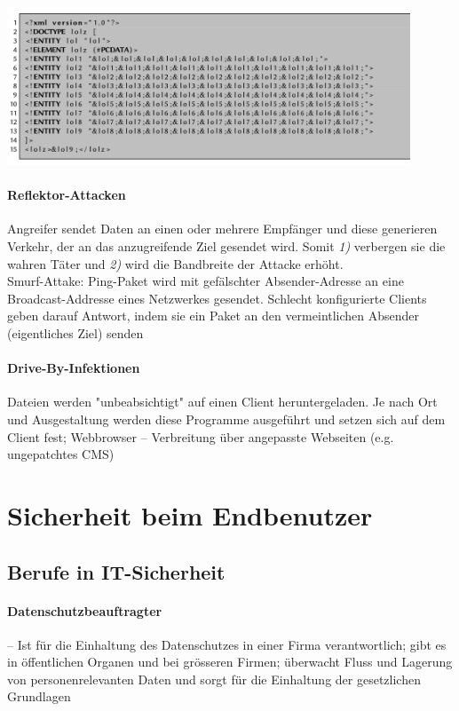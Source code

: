 \documentclass[a4paper,12pt]{article}
\begin{document}
\begin{center}
\includegraphics[width=12cm]{img/13_bi_lau.png}
\end{center}



\paragraph{Reflektor-Attacken}
Angreifer sendet Daten an einen oder mehrere Empfänger und diese generieren Verkehr, der an das anzugreifende Ziel gesendet wird. Somit \emph{1)} verbergen sie die wahren Täter und \emph{2)} wird die Bandbreite der Attacke erhöht.\\

Smurf-Attake: Ping-Paket wird mit gefälschter Absender-Adresse an eine Broadcast-Addresse eines Netzwerkes gesendet. Schlecht konfigurierte Clients geben darauf Antwort, indem sie ein Paket an den vermeintlichen Absender (eigentliches Ziel) senden


\paragraph{Drive-By-Infektionen}
Dateien werden "unbeabsichtigt" auf einen Client heruntergeladen. Je nach Ort und Ausgestaltung werden diese Programme ausgeführt und setzen sich auf dem Client fest; Webbrowser -- Verbreitung über angepasste Webseiten (e.g. ungepatchtes CMS)


\newpage
\section{Sicherheit beim Endbenutzer}

\subsection{Berufe in IT-Sicherheit}

\paragraph{Datenschutzbeauftragter} -- Ist für die Einhaltung des Datenschutzes in einer Firma verantwortlich; gibt es in öffentlichen Organen und bei grösseren Firmen; überwacht Fluss und Lagerung von personenrelevanten Daten und sorgt für die Einhaltung der gesetzlichen Grundlagen
\end{document}

